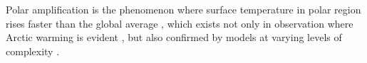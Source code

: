 

 

Polar amplification is the phenomenon where surface temperature in polar region rises faster than the global average \citep{IPCC2007Synth}, which exists not only in observation where Arctic warming is evident \citep{Johannessen2004,Polyakov2002}, but also confirmed by models at varying levels of complexity \citep[e.g.,][]{Winton2006amplified,Langen2007,Merlis2018,Alexeev2005}.

